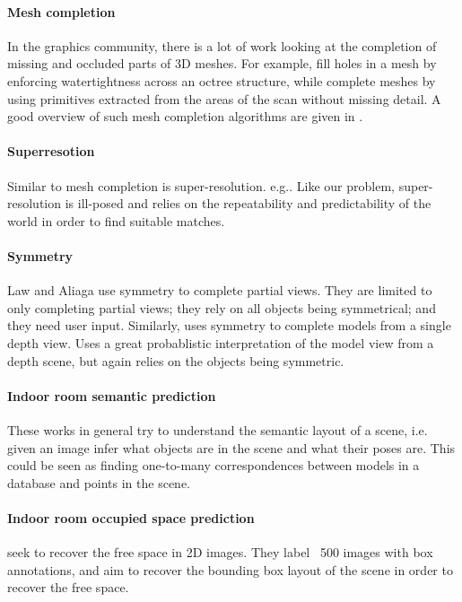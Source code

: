 \documentclass[10pt,a4paper]{article}
\makeatletter
\newcommand*{\eg}{e.g.\@\xspace}
\newcommand*{\ie}{i.e.\@\xspace}
\makeatother
\begin{document}
\paragraph{Mesh completion}
In the graphics community, there is a lot of work looking at the completion of missing and occluded parts of 3D meshes. 
For example, \cite{podolak-esgp-2005} fill holes in a mesh by enforcing watertightness across an octree structure, while \cite{schnabel-eurographics-2009} complete meshes by using primitives extracted from the areas of the scan without missing detail. 
A good overview of such mesh completion algorithms are given in \cite{ju-cst-2009}.

\paragraph{Superresotion}
Similar to mesh completion is super-resolution. \eg \cite{macaodha-eccv-2012}. 
Like our problem, super-resolution is ill-posed and relies on the repeatability and predictability of the world in order to find suitable matches.

\paragraph{Symmetry}
Law and Aliaga \cite{law-cviu-2010} use symmetry to complete partial views. 
They are limited to only completing partial views; they rely on all objects being symmetrical; and they need user input.
Similarly, \cite{thrun-iccv-2005} uses symmetry to complete models from a single depth view. 
Uses a great probablistic interpretation of the model view from a depth scene, but again relies on the objects being symmetric.

\paragraph{Indoor room semantic prediction}
These works in general try to understand the semantic layout of a scene, \ie given an image infer what objects are in the scene and what their poses are.
\cite{nan-acm-2012, minkim-siggraphasia-2012}
This could be seen as finding one-to-many correspondences between models in a database and points in the scene.

\paragraph{Indoor room occupied space prediction}
\cite{hedau-cvpr-2012} seek to recover the free space in 2D images. They label ~500 images with box annotations, and aim to recover the bounding box layout of the scene in order to recover the free space.
\end{document}
